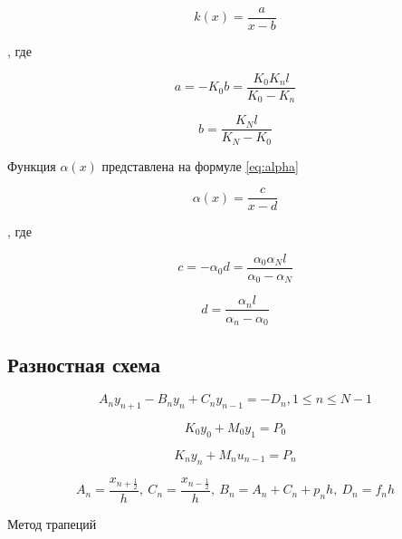 \begin{equation}\label{eq:k}
    k(x) = \frac{a}{x - b}
\end{equation}

, где

\begin{equation*}
    a = -K_0 b = \frac{K_0 K_n l}{K_0 - K_n}
\end{equation*}

\begin{equation*}
    b = \frac{K_N l}{K_N - K_0}
\end{equation*}

Функция $\alpha(x)$ представлена на формуле \ref{eq:alpha}

\begin{equation}\label{eq:alpha}
    \alpha(x) = \frac{c}{x- d}
\end{equation}

, где

\begin{equation*}
    c = -\alpha_0d = \frac{\alpha_0 \alpha_N l}{\alpha_0 - \alpha_N}
\end{equation*}

\begin{equation*}
    d = \frac{\alpha_n l}{\alpha_n - \alpha_0}
\end{equation*}

\subsection{Разностная схема}

\begin{equation}\label{eq:main}
    A_n y_{n+1} - B_n y_n + C_n y_{n-1} = -D_n, 1 \le n \le N-1
\end{equation}

\begin{equation}\label{eq:start_left}
    K_0 y_0 + M_0 y_1 = P_0
\end{equation}

\begin{equation}\label{eq:start_right}
    K_n y_n + M_n u_{n-1} = P_n
\end{equation}

\begin{equation*}
    A_n = \frac{x_{n+\frac{1}{2}}}{h},\ C_n = \frac{x_{n-\frac{1}{2}}}{h},
    \ B_n = A_n + C_n + p_n h,\ D_n = f_nh
\end{equation*}

Метод трапеций

